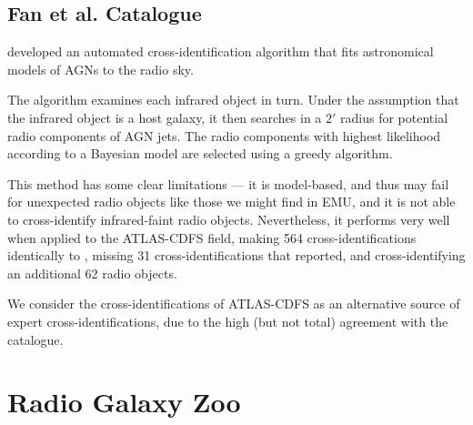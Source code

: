         \subsection{Fan et al. Catalogue}
        \label{sec:fan}

            \citet{fan15} developed an automated cross-identification algorithm
            that fits astronomical models of AGNs to the radio sky.

            The algorithm examines each infrared object in turn. Under the
            assumption that the infrared object is a host galaxy, it then
            searches in a $2'$ radius for potential radio components of AGN
            jets. The radio components with highest likelihood according to a
            Bayesian model are selected using a greedy algorithm.

            This method has some clear limitations --- it is model-based, and
            thus may fail for unexpected radio objects like those we might find
            in EMU, and it is not able to cross-identify infrared-faint radio
            objects. Nevertheless, it performs very well when applied to the
            ATLAS-CDFS field, making 564 cross-identifications identically to
            \citeauthor{norris06}, missing 31 cross-identifications that
            \citeauthor{norris06} reported, and cross-identifying an additional
            62 radio objects.

            We consider the \citeauthor{fan15} cross-identifications of
            ATLAS-CDFS as an alternative source of expert cross-identifications,
            due to the high (but not total) agreement with the
            \citeauthor{norris06} catalogue.

    \section{Radio Galaxy Zoo}
    \label{sec:radio-galaxy-zoo}

